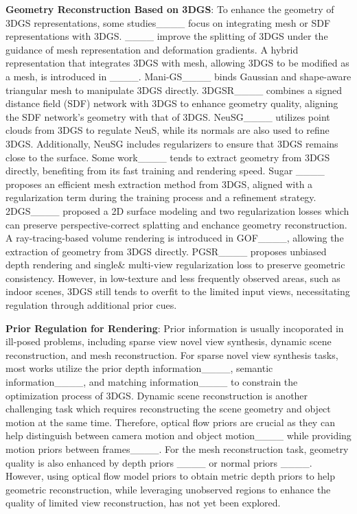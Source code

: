 \textbf{Geometry Reconstruction Based on 3DGS}: 
To enhance the geometry of 3DGS representations, 
some studies____ 
focus on integrating mesh or SDF representations with 3DGS.
____ improve the splitting of 3DGS under the guidance of
mesh representation and deformation gradients. 
%
A hybrid representation that integrates 3DGS with mesh, 
allowing 3DGS to be modified as a mesh, is introduced in 
____.
%
Mani-GS____ binds Gaussian and shape-aware triangular mesh to manipulate 3DGS directly.
%
3DGSR____ combines a signed distance field (SDF) 
network with 3DGS to enhance geometry quality, 
aligning the SDF network’s geometry with that of 3DGS.
%
NeuSG____ utilizes point clouds from 
3DGS to regulate NeuS, while its normals are also used 
to refine 3DGS. Additionally, NeuSG includes regularizers 
to ensure that 3DGS remains close to the surface.
%
Some work____ 
tends to extract geometry from 3DGS directly, benefiting from 
its fast training and rendering speed.
Sugar ____
proposes an efficient mesh extraction method from 3DGS, aligned with
a regularization term during the training process and a refinement strategy.
%
2DGS____ proposed a 2D surface modeling and two regularization 
losses which can preserve perspective-correct splatting and enchance geometry 
reconstruction.
%
A ray-tracing-based volume rendering is introduced in 
GOF____,
allowing the extraction of geometry from 3DGS directly.
%
PGSR____ proposes unbiased depth rendering
and single\& multi-view regularization loss to preserve 
geometric consistency.
%
However, in low-texture and less frequently observed areas, 
such as indoor scenes, 3DGS still tends to overfit to 
the limited input views, necessitating regulation 
through additional prior cues.

%

%
\textbf{Prior Regulation for Rendering}:
Prior information is usually incoporated in ill-posed problems,
including sparse view novel view synthesis, dynamic scene reconstruction,
and mesh reconstruction.
For sparse novel view synthesis tasks, most works utilize the prior depth information____, semantic information____, and matching information____ 
to constrain the optimization process of 3DGS.
Dynamic scene reconstruction is another challenging
task which requires reconstructing the scene geometry and object motion at the same
time. 
Therefore, optical flow priors are crucial as
they can help distinguish between camera motion 
and object motion____ 
while providing motion priors between frames____.
For the mesh reconstruction task,
geometry quality is also
enhanced by depth priors  
____ 
or normal priors ____. 
%
However, using optical flow model priors to obtain metric depth priors 
to help geometric reconstruction, 
while leveraging unobserved regions to enhance the quality 
of limited view reconstruction, has not yet been explored.
%